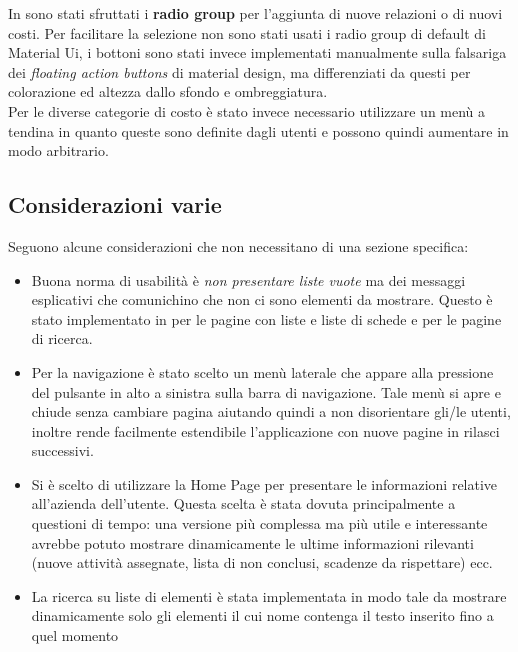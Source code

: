 In \fiscoloMobile{} sono stati sfruttati i \textbf{radio group} per l'aggiunta di nuove
relazioni o di nuovi costi. Per facilitare la selezione non sono stati usati i radio group
di default di Material Ui, i bottoni sono stati invece implementati manualmente sulla falsariga
dei \textit{floating action buttons} di material design, ma differenziati da questi per
colorazione ed altezza dallo sfondo e ombreggiatura.  \\

Per le diverse categorie di costo è stato invece necessario utilizzare un menù a tendina
in quanto queste sono definite dagli utenti e possono quindi aumentare in modo arbitrario.

\subsection{Considerazioni varie}

Seguono alcune considerazioni che non necessitano di una sezione specifica:

\begin{itemize}
\item Buona norma di usabilità è \textit{non presentare liste vuote} ma dei messaggi esplicativi
che comunichino che non ci sono elementi da mostrare. Questo è stato implementato in
\fiscoloMobile{} per le pagine con liste e liste di schede e per le pagine di ricerca.
\item Per la navigazione è stato scelto un menù laterale che appare alla pressione
del pulsante in alto a sinistra sulla barra di navigazione. Tale menù si apre e chiude senza
cambiare pagina aiutando quindi a non disorientare gli/le utenti, inoltre rende facilmente
estendibile l'applicazione con nuove pagine in rilasci successivi.
\item Si è scelto di utilizzare la Home Page per presentare le informazioni relative all'azienda
dell'utente. Questa scelta è stata dovuta principalmente a questioni di tempo: una versione
più complessa ma più utile e interessante avrebbe potuto mostrare dinamicamente le ultime
informazioni rilevanti (nuove attività assegnate, lista di  non conclusi, scadenze
da rispettare) ecc.
\item La ricerca su liste di elementi è stata implementata in modo tale da mostrare dinamicamente
solo gli elementi il cui nome contenga il testo inserito fino a quel momento
\end{itemize}
